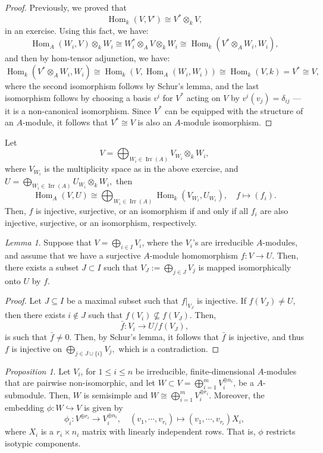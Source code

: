 \documentclass[a4paper]{report}
\theoremstyle{definition}
\theoremstyle{remark}
\theoremstyle{proposition}
\newtheorem{proposition}{Proposition}
\theoremstyle{conjecture}
\theoremstyle{lemma}
\newtheorem{lemma}{Lemma}
\theoremstyle{corollary}
\theoremstyle{exercise}
\theoremstyle{example}
\newcommand{\on}{\operatorname}
\begin{document}
\begin{proof}
    Previously, we proved that $$\on{Hom}_k(V,V') \cong V^\ast \otimes_kV,$$
    in an exercise. Using this fact, we have:
    $$\on{Hom}_A(W_i,V) \otimes_k W_i \cong W_i^\ast \otimes_A V \otimes_k W_i \cong \on{Hom}_k(V^\ast \otimes_A W_i, W_i),$$
    and then by hom-tensor adjunction, we have:
    $$\on{Hom}_k(V^\ast\otimes_A W_i,W_i) \cong \on{Hom}_k(V, \on{Hom}_A(W_i,W_i)) \cong \on{Hom}_k(V, k) = V^\ast \cong V,$$
    where the second isomorphism follows by Schur's lemma, and the 
    last isomorphism follows by choosing a basis $v^i$ for $V^\ast$
    acting on $V$ by $v^i(v_j) = \delta_{ij}$ --- it is a non-canonical 
    isomorphism. Since $V^\ast$ can be equipped with the structure of an 
    $A$-module, it follows that $V^\ast \cong V$ is also an $A$-module
    isomorphism.
\end{proof}

Let $$V = \bigoplus_{W_i \in \on{Irr}(A)} V_{W_i} \otimes_kW_i,$$
where $V_{W_i}$ is the multiplicity space as in the above 
exercise,
and $U = \bigoplus_{W_i\in \on{Irr}(A)} U_{W_i} \otimes_kW_i,$
then $$\on{Hom}_A(V,U) \cong \bigoplus_{W_i \in \on{Irr}(A)} \on{Hom}_k(V_{W_i},U_{W_i}), \quad f \longmapsto (f_i).$$
Then, $f$ is injective, surjective, or an isomorphism if and only if 
all $f_i$ are also injective, surjective, or an isomorphism, respectively.

\begin{lemma}\label{lem14}
    Suppose that $V = \bigoplus_{i\in I}V_i$, where the $V_i$'s are irreducible
    $A$-modules, and assume that we have a surjective $A$-module 
    homomorphism $f : V \to U$. Then, there exists a subset $J\subset I$ 
    such that 
    $V_J := \bigoplus_{j \in J} V_j$ is mapped isomorphically 
    onto $U$ by $f$.
\end{lemma}

\begin{proof}
    Let $J\subseteq I$ be a maximal subset such that $f\vert_{V_J}$ 
    is injective. If $f(V_J) \neq U$, then there exists 
    $i\not\in J$ such that $f(V_i) \not\subseteq f(V_J)$. Then, 
    $$\bar{f} : V_i \longrightarrow U/f(V_J),$$
    is such that $\bar{f} \neq 0$. Then, by Schur's lemma, 
    it follows that $\bar{f}$ is injective, and thus 
    $f$ is injective on $\bigoplus_{j \in J\cup \lbrace i \rbrace} V_j,$
    which is a contradiction.
\end{proof}

\begin{proposition}\label{prop22}
    Let $V_i$, for $1\leq i \leq n$ be irreducible, finite-dimensional
    $A$-modules that are pairwise non-isomorphic, and let 
    $W\subset V = \bigoplus_{i=1}^m V_i^{\oplus n_i}$, be a 
    $A$-submodule. Then, $W$ is semisimple and 
    $W \cong \bigoplus_{i=1}^m V_i^{\oplus r_i}$.
    Moreover, the embedding $\phi : W \hookrightarrow V$ is given by 
    $$\phi_i : V^{\oplus r_i} \longrightarrow V_i^{\oplus n_i}, \quad (v_1,\cdots,v_{r_i}) \longmapsto (v_1,\cdots,v_{r_i})X_i,$$
    where $X_i$ is a $r_i \times n_i$ matrix with linearly independent rows.
    That is, $\phi$ restricts isotypic components.
\end{proposition}
\end{document}

